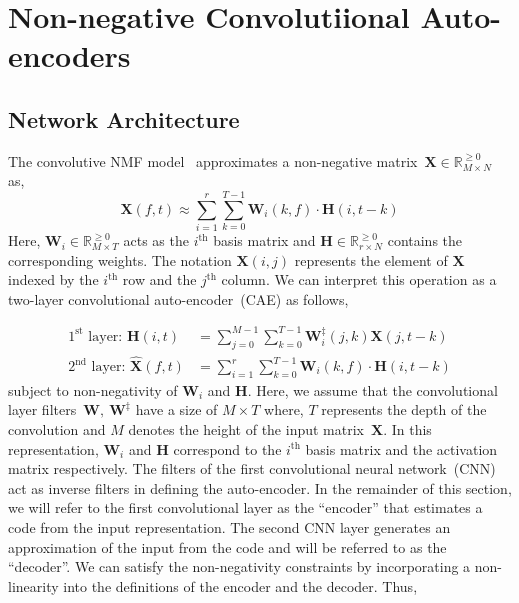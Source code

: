 \documentclass{article}
\begin{document}
\section{Non-negative Convolutiional Auto-encoders}
\subsection{Network Architecture}
\label{sec:conv-nmf}
The convolutive NMF model~\cite{smaragdis2007convolutive} approximates a non-negative matrix~$\mathbf{X}\in \mathbb{R}_{M \times N}^{\geq0}$ as,
\begin{equation}
    \mathbf{X}(f,t) \approx \sum_{i=1}^{r} \sum_{k=0}^{T-1} \mathbf{W}_{i}(k,f)\cdot\mathbf{H}(i,t-k)
\end{equation}
Here, $\mathbf{W}_{i} \in \mathbb{R}_{M \times T}^{\geq0}$ acts as the $i^{\text{th}}$ basis matrix and $\mathbf{H} \in \mathbb{R}_{r \times N}^{\geq0}$ contains the corresponding weights. The notation $\mathbf{X}(i,j)$ represents the element of $\mathbf{X}$ indexed by the $i^{\text{th}}$ row and the $j^{\text{th}}$ column. We can interpret this operation as a two-layer convolutional auto-encoder~(CAE) as follows,

\begin{align}
    \text{$1^{\text{st}}$ layer:~}\mathbf{H}(i,t) &= \sum_{j=0}^{M-1} \sum_{k=0}^{T-1} \mathbf{W}_{i}^{\ddagger}(j,k)\mathbf{X}(j,t-k) \\
    \text{$2^{\text{nd}}$ layer:~}\hat{\mathbf{X}}(f,t) &= \sum_{i=1}^{r} \sum_{k=0}^{T-1} \mathbf{W}_{i}(k,f)\cdot\mathbf{H}(i,t-k)
    \label{eq:nmfcnncnn}
\end{align}
subject to non-negativity of $\mathbf{W}_{i}$ and $\mathbf{H}$. Here, we assume that the convolutional layer filters~$\mathbf{W},~\mathbf{W}^{\ddagger}$ have a size of $M\times T$ where, $T$ represents the depth of the convolution and $M$ denotes the height of the input matrix~$\mathbf{X}$. In this representation, $\mathbf{W}_{i}$ and $\mathbf{H}$ correspond to the $i^{\text{th}}$ basis matrix and the activation matrix respectively. The filters of the first convolutional neural network~(CNN) act as inverse filters in defining the auto-encoder. In the remainder of this section, we will refer to the first convolutional layer as the ``encoder'' that estimates a code from the input representation. The second CNN layer generates an approximation of the input from the code and will be referred to as the ``decoder''. We can satisfy the non-negativity constraints by incorporating a non-linearity into the definitions of the encoder and the decoder. Thus,
\end{document}
